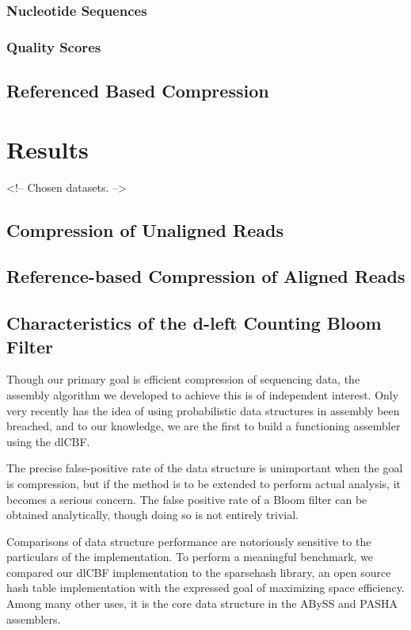 \documentclass[twocolumn]{article}
\begin{document}
\subsubsection{Nucleotide Sequences}

\subsubsection{Quality Scores}

\subsection{Referenced Based Compression}





\section{Results}

<!-- Chosen datasets. -->

\subsection{Compression of Unaligned Reads}

\subsection{Reference-based Compression of Aligned Reads}

\subsection{Characteristics of the d-left Counting Bloom Filter}

Though our primary goal is efficient compression of sequencing data, the
assembly algorithm we developed to achieve this is of independent interest.
Only very recently has the idea of using probabilistic data structures in
assembly been breached, and to our knowledge, we are the first to build
a functioning assembler using the dlCBF.

The precise false-positive rate of the data structure is unimportant when the
goal is compression, but if the method is to be extended to perform actual
analysis, it becomes a serious concern. The false positive rate of a Bloom
filter can be obtained analytically, though doing so is not entirely trivial.

Comparisons of data structure performance are notoriously sensitive to the
particulars of the implementation. To perform a meaningful benchmark, we
compared our dlCBF implementation to the sparsehash library, an open source
hash table implementation with the expressed goal of maximizing space
efficiency. Among many other uses, it is the core data structure in the ABySS
\citep{Simpson2011} and PASHA \citep{Liu2011} assemblers.
\end{document}
